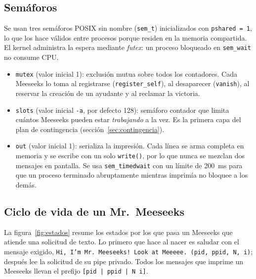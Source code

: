 \documentclass[11pt,letterpaper]{article}
\makeatletter
\newcommand{\codigo}[2]{%
  \edef\lin{\csname line@#1\endcsname}%
  }
\makeatother
\begin{document}
\subsection{Semáforos}

Se usan tres semáforos POSIX sin nombre (\texttt{sem\_t}) inicializados con
\texttt{pshared = 1}, lo que los hace válidos entre procesos porque residen en la memoria
compartida. El kernel administra la espera mediante \emph{futex}: un proceso bloqueado en
\texttt{sem\_wait} no consume CPU.

\begin{itemize}[leftmargin=1.5em]
\item \texttt{mutex} (valor inicial 1): exclusión mutua sobre todos los contadores. Cada
  Meeseeks lo toma al registrarse (\texttt{register\_self}), al desaparecer
  (\texttt{vanish}), al reservar la creación de un ayudante y al reclamar la victoria.
\item \texttt{slots} (valor inicial \texttt{-a}, por defecto 128): semáforo contador que
  limita cuántos Meeseeks pueden estar \emph{trabajando} a la vez. Es la primera capa del
  plan de contingencia (sección~\ref{sec:contingencia}).
\item \texttt{out} (valor inicial 1): serializa la impresión. Cada línea se arma completa
  en memoria y se escribe con un solo \texttt{write()}, por lo que nunca se mezclan dos
  mensajes en pantalla. Se usa \texttt{sem\_timedwait} con un límite de 200~ms para que un
  proceso terminado abruptamente mientras imprimía no bloquee a los demás.
\end{itemize}

\codigo{register}{Registro de un Meeseeks en los contadores compartidos}
\codigo{vanish}{Desaparición: actualiza estadísticas y libera su \emph{slot}}

\subsection{Ciclo de vida de un Mr.\ Meeseeks}

La figura~\ref{fig:estados} resume los estados por los que pasa un Meeseeks que atiende
una solicitud de texto. Lo primero que hace al nacer es saludar con el mensaje exigido,
\texttt{Hi, I'm Mr. Meeseeks! Look at Meeeee. (pid, ppid, N, i)}; después lee la solicitud
de su pipe privado. Todos los mensajes que imprime un Meeseeks llevan el prefijo
\texttt{[pid | ppid | N i]}.
\end{document}

